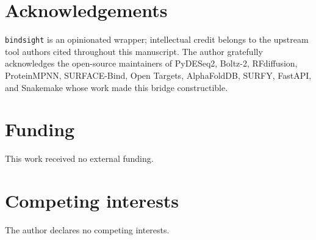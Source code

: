 \documentclass[11pt,letterpaper]{article}
\begin{document}
\section*{Acknowledgements}

\texttt{bindsight} is an opinionated wrapper; intellectual credit belongs to
the upstream tool authors cited throughout this manuscript. The author
gratefully acknowledges the open-source maintainers of PyDESeq2, Boltz-2,
RFdiffusion, ProteinMPNN, SURFACE-Bind, Open Targets, AlphaFoldDB, SURFY,
FastAPI, and Snakemake whose work made this bridge constructible.

\section*{Funding}

This work received no external funding.

\section*{Competing interests}

The author declares no competing interests.

\printbibliography
\end{document}
